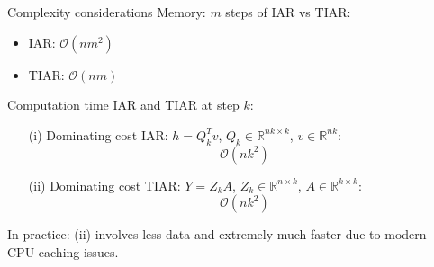 \documentclass[10pt]{beamer}
\newcommand{\RR}{\mathbb{R}}
\begin{document}
\begin{frame}
\begin{block}{Complexity considerations}
  Memory: $m$ steps of IAR vs TIAR:
  \begin{itemize}
    \item IAR: $\mathcal{O}(nm^2)$
    \item TIAR: $\mathcal{O}(nm)$
  \end{itemize}\pause
  Computation time IAR and TIAR at step $k$: 
  \begin{itemize}
    \item[(i)] Dominating cost IAR: $h=Q_k^Tv$, $Q_k\in\RR^{nk\times k}$, $v\in\RR^{nk}$: 
\[\mathcal{O}(nk^2)
\]\pause
    \item[(ii)] Dominating cost TIAR: $Y=Z_kA$, $Z_k\in\RR^{n\times k}$, $A\in\RR^{k\times k}$: 
\[\mathcal{O}(nk^2)
\]
  \end{itemize}\pause
In practice: (ii) involves less data and extremely much faster
due to modern CPU-caching issues. 
\end{block}

\end{frame}
%
\end{document}
